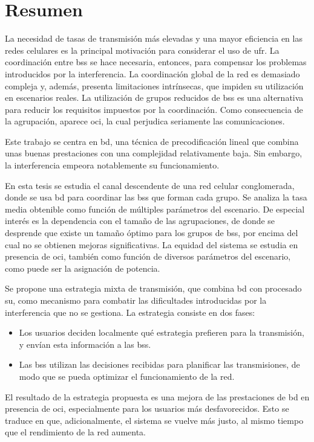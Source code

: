 \chapter*{Resumen}

La necesidad de tasas de transmisión más elevadas y una mayor eficiencia en las
redes celulares es la principal motivación para considerar el uso de \gls{ufr}.
La coordinación entre \glspl{bs} se hace necesaria, entonces, para compensar los
problemas introducidos por la interferencia. La coordinación global de la red es
demasiado compleja y, además, presenta limitaciones intrínsecas, que impiden su
utilización en escenarios reales. La utilización de grupos reducidos de
\glspl{bs} es una alternativa para reducir los requisitos impuestos por la
coordinación. Como consecuencia de la agrupación, aparece \gls{oci}, la cual
perjudica seriamente las comunicaciones.

Este trabajo se centra en \gls{bd}, una técnica de precodificación lineal que
combina unas buenas prestaciones con una complejidad relativamente baja. Sin
embargo, la interferencia empeora notablemente su funcionamiento.

En esta tesis se estudia el canal descendente de una red celular conglomerada,
donde se usa \gls{bd} para coordinar las \glspl{bs} que forman cada grupo. Se
analiza la tasa media obtenible como función de múltiples parámetros del
escenario. De especial interés es la dependencia con el tamaño de las
agrupaciones, de donde se desprende que existe un tamaño óptimo para los grupos
de \glspl{bs}, por encima del cual no se obtienen mejoras significativas. La
equidad del sistema se estudia en presencia de \gls{oci}, también como función
de diversos parámetros del escenario, como puede ser la asignación de potencia.

Se propone una estrategia mixta de transmisión, que combina \gls{bd} con
procesado \gls{su}, como mecanismo para combatir las dificultades introducidas
por la interferencia que no se gestiona. La estrategia consiste en dos fases:

\begin{itemize}
    \item Los usuarios deciden localmente qué estrategia prefieren para la
        transmisión, y envían esta información a las \glspl{bs}.
    \item Las \glspl{bs} utilizan las decisiones recibidas para planificar las
        transmisiones, de modo que se pueda optimizar el funcionamiento de la
        red.
\end{itemize}

El resultado de la estrategia propuesta es una mejora de las prestaciones de
\gls{bd} en presencia de \gls{oci}, especialmente para los usuarios más
desfavorecidos. Esto se traduce en que, adicionalmente, el sistema se vuelve más
justo, al mismo tiempo que el rendimiento de la red aumenta.
